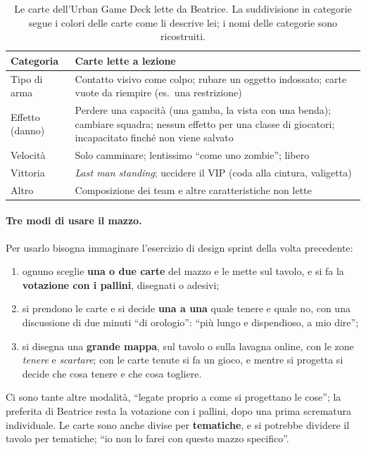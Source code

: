 \begin{table}[htbp]
\centering
\small
\begin{tabular}{@{}p{3.2cm}p{10cm}@{}}
\toprule
\textbf{Categoria} & \textbf{Carte lette a lezione} \\
\midrule
Tipo di arma & Contatto visivo come colpo; rubare un oggetto indossato; carte vuote
  da riempire (es.\ una restrizione) \\
Effetto (danno) & Perdere una capacità (una gamba, la vista con una benda); cambiare
  squadra; nessun effetto per una classe di giocatori; incapacitato finché non viene
  salvato \\
Velocità & Solo camminare; lentissimo ``come uno zombie''; libero \\
Vittoria & \emph{Last man standing}; uccidere il VIP (coda alla cintura, valigetta) \\
Altro & Composizione dei team e altre caratteristiche non lette \\
\bottomrule
\end{tabular}
\caption{Le carte dell'Urban Game Deck lette da Beatrice. La suddivisione in
categorie segue i colori delle carte come li descrive lei; i nomi delle categorie sono
ricostruiti.}
\label{a9:tab:urban}
\end{table}

\paragraph{Tre modi di usare il mazzo.} Per usarlo bisogna immaginare l'esercizio di
design sprint della volta precedente:
\begin{enumerate}
  \item ognuno sceglie \textbf{una o due carte} del mazzo e le mette sul tavolo, e si
        fa la \textbf{votazione con i pallini}, disegnati o adesivi;
  \item si prendono le carte e si decide \textbf{una a una} quale tenere e quale no,
        con una discussione di due minuti ``di orologio'': ``più lungo e dispendioso, a
        mio dire'';
  \item si disegna una \textbf{grande mappa}, sul tavolo o sulla lavagna online, con
        le zone \emph{tenere} e \emph{scartare}; con le carte tenute si fa un gioco, e
        mentre si progetta si decide che cosa tenere e che cosa togliere.
\end{enumerate}
Ci sono tante altre modalità, ``legate proprio a come si progettano le cose''; la
preferita di Beatrice resta la votazione con i pallini, dopo una prima scrematura
individuale. Le carte sono anche divise per \textbf{tematiche}, e si potrebbe dividere
il tavolo per tematiche; ``io non lo farei con questo mazzo specifico''.

